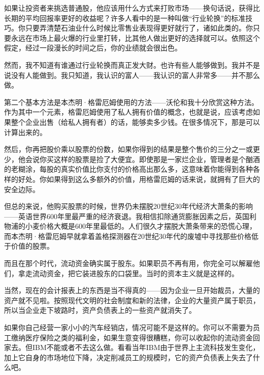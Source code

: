 如果让投资者来挑选普通股，他应该用什么方式来打败市场——换句话说，获得比长期的平均回报率更好的收益呢？许多人看中的是一种叫做“行业轮换”的标准技巧。你只要弄清楚石油业什么时候比零售业表现得更好就行了，诸如此类的。你只要永远在市场上最火爆的行业里打转，比其他人做出更好的选择就可以。依照这个假定，经过一段漫长的时间之后，你的业绩就会很出色。
\par

然而，我不知道有谁通过行业轮换而真正发大财。也许有些人能够做到。我并不是说没有人能做到。我只知道，我认识的富人——我认识的富人非常多——并不那么做。
\par

第二个基本方法是本杰明·格雷厄姆使用的方法——沃伦和我十分欣赏这种方法。作为其中一个元素，格雷厄姆使用了私人拥有价值的概念，也就是说，应该考虑如果整个企业出售（给私人拥有者）的话，能够卖多少钱。在很多情况下，那是可以计算出来的。
\par

然后，你再把股价乘以股票的份数，如果你得到的结果是整个售价的三分之一或更少，他会说你买这样的股票是捡了大便宜。即使那是一家烂企业，管理者是个酗酒的老糊涂，每股的真实价值比你支付的价格高出那么多，这意味着你能得到各种各样的好处。你如果得到这么多额外的价值，用格雷厄姆的话来说，就拥有了巨大的安全边际。
\par

但总的来说，他购买股票的时候，世界仍未摆脱20世纪30年代经济大萧条的影响——英语世界600年里最严重的经济衰退。我相信扣除通货膨胀因素之后，英国利物浦的小麦价格大概是600年里最低的。人们很久才摆脱大萧条带来的恐慌心理，而本杰明·格雷厄姆早就拿着盖格探测器在20世纪30年代的废墟中寻找那些价格低于价值的股票。
\par

而且在那个时代，流动资金确实属于股东。如果职员不再有用，你完全可以解雇他们，拿走流动资金，把它装进股东的口袋里。当时的资本主义就是这样的。
\par

当然，现在的会计报表上的东西是当不得真的——因为企业一旦开始裁员，大量的资产就不见啦。按照现代文明的社会制度和新的法律，企业的大量资产属于职员，所以当企业走下坡路时，资产负债表上的一些资产就消失了。
\par

如果你自己经营一家小小的汽车经销店，情况可能不是这样的。你可以不需要为员工缴纳医疗保险之类的福利金，如果生意变得很糟糕，你可以收起你的流动资金回家去。但IBM不能或者不去这么做。看看当年IBM由于世界上主流科技发生变化，加上它自身的市场地位下降，决定削减员工的规模时，它的资产负债表上失去了什么吧。
\par

